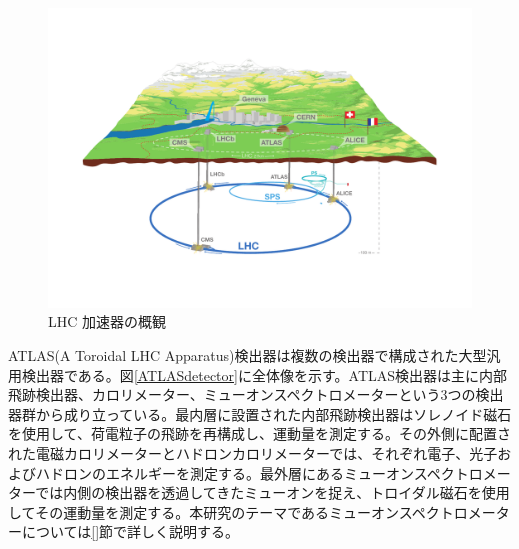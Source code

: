 \begin{figure} 
\centering
\includegraphics[width=16cm]{fig/Intro/LHCoverview.pdf}
\caption[LHC 加速器の概観]{LHC 加速器の概観\cite{cern_general_photo}}
\label{LHCoverview}
\end{figure}

ATLAS(A Toroidal LHC Apparatus)検出器は複数の検出器で構成された大型汎用検出器である。図\ref{ATLASdetector}に全体像を示す。ATLAS検出器は主に内部飛跡検出器、カロリメーター、ミューオンスペクトロメーターという3つの検出器群から成り立っている。最内層に設置された内部飛跡検出器はソレノイド磁石を使用して、荷電粒子の飛跡を再構成し、運動量を測定する。その外側に配置された電磁カロリメーターとハドロンカロリメーターでは、それぞれ電子、光子およびハドロンのエネルギーを測定する。最外層にあるミューオンスペクトロメーターでは内側の検出器を透過してきたミューオンを捉え、トロイダル磁石を使用してその運動量を測定する。本研究のテーマであるミューオンスペクトロメーターについては\ref{}節で詳しく説明する。

